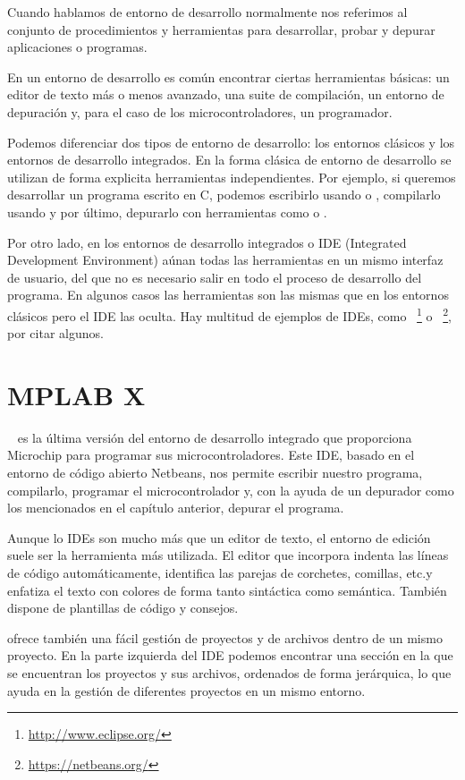 Cuando hablamos de entorno de desarrollo normalmente nos referimos al conjunto de procedimientos y herramientas para desarrollar, probar y depurar aplicaciones o programas.

En un entorno de desarrollo es común encontrar ciertas herramientas básicas: un editor de texto más o menos avanzado, una suite de compilación, un entorno de depuración y, para el caso de los microcontroladores, un programador.

Podemos diferenciar dos tipos de entorno de desarrollo: los entornos clásicos y los entornos de desarrollo integrados. En la forma clásica de entorno de desarrollo se utilizan de forma explicita herramientas independientes. Por ejemplo, si queremos desarrollar un programa escrito en C, podemos escribirlo usando  o , compilarlo usando  y por último, depurarlo con herramientas como  o .

Por otro lado, en los entornos de desarrollo integrados o IDE (Integrated Development Environment)  aúnan todas las herramientas en un mismo interfaz de usuario, del que no es necesario salir en todo el proceso de desarrollo del programa. En algunos casos las herramientas son las mismas que en los entornos clásicos pero el IDE las oculta. Hay multitud de ejemplos de IDEs, como ~\footnote{\url{http://www.eclipse.org/}} o ~\footnote{\url{https://netbeans.org/}}, por citar algunos.

\section{MPLAB X}
~\cite{website:mplab} es la última versión del entorno de desarrollo integrado que proporciona Microchip para programar sus microcontroladores. Este IDE, basado en el entorno de código abierto Netbeans, nos permite escribir nuestro programa, compilarlo, programar el microcontrolador y, con la ayuda de un depurador como los mencionados en el capítulo anterior, depurar el programa.

Aunque lo IDEs son mucho más que un editor de texto, el entorno de edición suele ser la herramienta más utilizada. El editor que incorpora  indenta las líneas de código automáticamente, identifica las parejas de corchetes, comillas, etc.\@ y enfatiza el texto con colores de forma tanto sintáctica como semántica. También dispone de plantillas de código y consejos.

 ofrece también una fácil gestión de proyectos y de archivos dentro de un mismo proyecto. En la parte izquierda del IDE podemos encontrar una sección en la que se encuentran los proyectos y sus archivos, ordenados de forma jerárquica, lo que ayuda en la gestión de diferentes proyectos en un mismo entorno.

